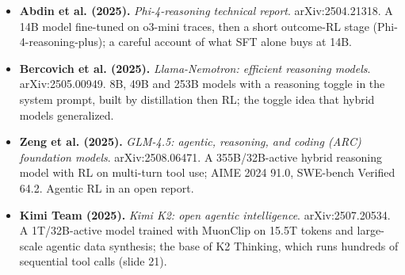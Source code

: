 \documentclass[11pt,letterpaper]{article}
\begin{document}
\begin{itemize}[leftmargin=1.2em,itemsep=3pt]
\item \textbf{Abdin et al. (2025).} \textit{Phi-4-reasoning technical report}. arXiv:2504.21318. A 14B model fine-tuned on o3-mini traces, then a short outcome-RL stage (Phi-4-reasoning-plus); a careful account of what SFT alone buys at 14B.
\item \textbf{Bercovich et al. (2025).} \textit{Llama-Nemotron: efficient reasoning models}. arXiv:2505.00949. 8B, 49B and 253B models with a reasoning toggle in the system prompt, built by distillation then RL; the toggle idea that hybrid models generalized.
\item \textbf{Zeng et al. (2025).} \textit{GLM-4.5: agentic, reasoning, and coding (ARC) foundation models}. arXiv:2508.06471. A 355B/32B-active hybrid reasoning model with RL on multi-turn tool use; AIME 2024 91.0, SWE-bench Verified 64.2. Agentic RL in an open report.
\item \textbf{Kimi Team (2025).} \textit{Kimi K2: open agentic intelligence}. arXiv:2507.20534. A 1T/32B-active model trained with MuonClip on 15.5T tokens and large-scale agentic data synthesis; the base of K2 Thinking, which runs hundreds of sequential tool calls (slide 21).
\end{itemize}
\end{document}

